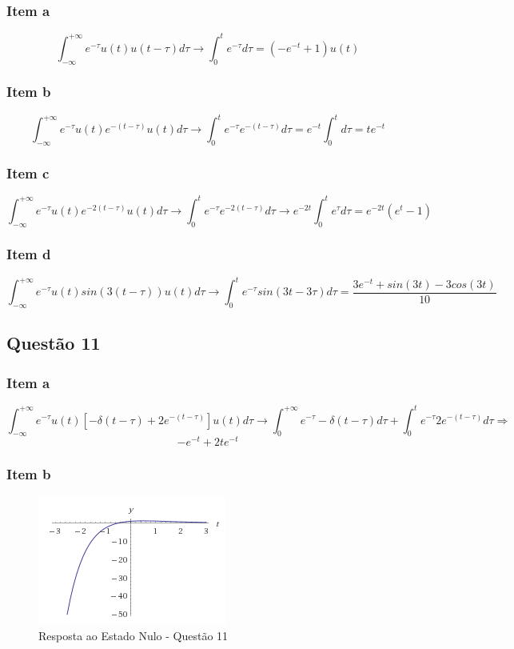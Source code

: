 \documentclass[a4paper, 12pt]{article}
\begin{document}
    \subsubsection{Item a} 
    \[ \int_{-\infty}^{+\infty} e^{-\tau}u(t)u(t-\tau) d\tau \rightarrow \int_{0}^{t} e^{-\tau} d\tau = (-e^{-t} + 1)u(t)\]        
    \subsubsection{Item b} 
    \[ \int_{-\infty}^{+\infty} e^{-\tau}u(t)e^{-(t-\tau)}u(t) d\tau \rightarrow \int_{0}^{t} e^{-\tau}e^{-(t-\tau)} d\tau = e^{-t}\int_{0}^{t} d\tau = te^{-t}\]       
    \subsubsection{Item c} 
    \[ \int_{-\infty}^{+\infty} e^{-\tau}u(t)e^{-2(t-\tau)}u(t) d\tau \rightarrow \int_{0}^{t} e^{-\tau}e^{-2(t-\tau)} d\tau \rightarrow e^{-2t}\int_{0}^{t} e^{\tau}d\tau = e^{-2t}(e^{t} -1)\]          
    \subsubsection{Item d} 
    \[ \int_{-\infty}^{+\infty} e^{-\tau}u(t)sin(3(t-\tau))u(t) d\tau \rightarrow \int_{0}^{t} e^{-\tau}sin(3t-3\tau) d\tau = \frac{3e^{-t}+sin(3t)-3cos(3t)}{10}\]       
    \subsection{Quest\~{a}o 11}
    \subsubsection{Item a} 
    \[ \int_{-\infty}^{+\infty} e^{-\tau}u(t)[-\delta(t-\tau) + 2e^{-(t-\tau)}]u(t) d\tau \rightarrow \int_{0}^{+\infty} e^{-\tau}-\delta(t-\tau)d\tau + \int_{0}^{t}e^{-\tau}2e^{-(t-\tau)}d\tau \Rightarrow\]     
    \[-e^{-t} + 2te^{-t}\]
    \newpage
    \subsubsection{Item b} 
    \begin{figure}[!ht]
          	\centering
          	\includegraphics{img/Figura1.PNG}
          	\caption{Resposta ao Estado Nulo - Quest\~{a}o 11}
    \end{figure}    
    
\end{document}
